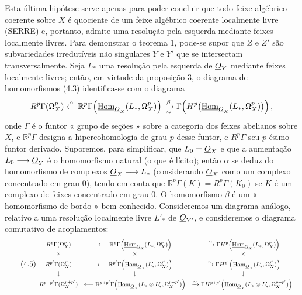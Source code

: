 Esta última hipótese serve apenas para poder concluir que todo
feixe algébrico coerente sobre $X$ é quociente de um feixe algébrico
coerente localmente livre (SERRE) e, portanto, admite uma resolução pela esquerda mediante
feixes localmente livres. Para demonstrar o teorema 1, pode-se supor que
$Z$ e $Z'$ são subvariedades irredutíveis não singulares $Y$ e $Y'$ que se
intersectam transversalmente. Seja $L_{*}$ uma resolução pela esquerda de $\underline{O}_Y$ mediante
feixes localmente livres; então, em virtude da proposição 3, o diagrama
de homomorfismos (4.3) identifica-se com o diagrama
\[
R^{p}\Gamma(\Omega_X^{p})
\xleftarrow{\alpha}
\mathbb R^{p}\Gamma\!\left(\underline{\operatorname{Hom}}_{\underline{O}_X}(L_{*},\Omega_X^{p})\right)
\xrightarrow[\sim]{\beta}
\Gamma\!\left(H^{p}\bigl(\underline{\operatorname{Hom}}_{\underline{O}_X}(L_{*},\Omega_X^{p})\bigr)\right),
\]
onde $\Gamma$ é o funtor « grupo de seções » sobre a categoria dos
feixes abelianos sobre $X$, e $\mathbb R^{p}\Gamma$ designa
a hipercohomologia de grau $p$ desse funtor, e $R^{p}\Gamma$ seu
$p$-ésimo funtor derivado. Suporemos, para simplificar, que $L_0=\underline{O}_X$ e que
a aumentação $L_0\longrightarrow\underline{O}_Y$ é o homomorfismo natural (o que
é lícito); então $\alpha$ se deduz do homomorfismo de complexos
$\underline{O}_X\longrightarrow L_{*}$ (considerando $\underline{O}_X$ como um complexo concentrado
em grau $0$), tendo em conta que $\mathbb R^{p}\Gamma(K)=R^{p}\Gamma(K_0)$ se $K$
é um complexo de feixes concentrado em grau $0$. O homomorfismo $\beta$ é um
« homomorfismo de bordo » bem conhecido. Consideremos um diagrama análogo, relativo a
uma resolução localmente livre $L'_{*}$ de $\underline{O}_{Y'}$, e consideremos o
diagrama comutativo de acoplamentos:
\begin{equation}\tag{4.5}
\resizebox{\textwidth}{!}{$
\begin{array}{ccc}
R^{p}\Gamma(\Omega_X^{p})
&\longleftarrow
\mathbb R^{p}\Gamma\!\left(\Homsh_{\Osh_X}(L_{*},\Omega_X^{p})\right)
&\xrightarrow{\sim}
\Gamma H^{p}\!\left(\Homsh_{\Osh_X}(L_{*},\Omega_X^{p})\right)
\\[3pt]
\times&\times&\times\\[3pt]
R^{p'}\Gamma(\Omega_X^{p'})
&\longleftarrow
\mathbb R^{p'}\Gamma\!\left(\Homsh_{\Osh_X}(L'_{*},\Omega_X^{p'})\right)
&\xrightarrow{\sim}
\Gamma H^{p'}\!\left(\Homsh_{\Osh_X}(L'_{*},\Omega_X^{p'})\right)
\\[3pt]
\downarrow&\downarrow&\downarrow\\[3pt]
R^{p+p'}\Gamma(\Omega_X^{p+p'})
&\longleftarrow
\mathbb R^{p+p'}\Gamma\!\left(
\Homsh_{\Osh_X}(L_{*}\otimes L'_{*},\Omega_X^{p+p'})\right)
&\xrightarrow{\sim}
\Gamma H^{p+p'}\!\left(
\Homsh_{\Osh_X}(L_{*}\otimes L'_{*},\Omega_X^{p+p'})\right).
\end{array}
$}
\end{equation}

